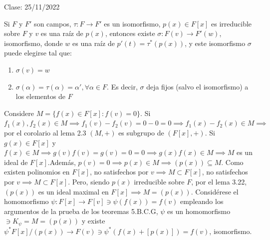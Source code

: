 Clase: 25/11/2022


\begin{teorema}[5I]
    Si $F$ y $F'$ son campos, $\tau:F\to F'$ es un isomorfismo, $p(x)\in F[x]$ es irreducible sobre $F$ y $v$ es una raíz de $p(x)$, entonces existe $\sigma:F(v)\to F'(w)$, isomorfismo, donde $w$ es una raíz de $p'(t)=\tau^*(p(x))$, y este isomorfismo $\sigma$ puede elegirse tal que:
    \begin{enumerate}
        \item $\sigma(v)=w$
        \item $\sigma(\alpha)=\tau(\alpha)=\alpha',\forall \alpha \in F$. Es decir, $\sigma$ deja fijos (salvo el isomorfismo) a los elementos de $F$
    \end{enumerate}
    \begin{dem}
        Considere $M=\{f(x)\in F[x]:f(v)=0\}$. Si $f_1(x),f_2(x)\in M\implies f_1(v)-f_2(v)=0-0=0\implies f_1(x)-f_2(x)\in M\implies$ por el corolario al lema 2.3 $(M,+)$ es subgrupo de $(F[x], +)$. Si $g(x)\in F[x]$ y $f(x)\in M\implies g(v)f(v)=g(v)=0=0\implies g(x)f(x)\in M\implies M$ es un ideal de $F[x]$.Además, $p(v)=0\implies p(x)\in M\implies (p(x))\subseteq M$.
        Como existen polinomios en $F[x]$, no satisfechos por $v\implies M\subset F[x]$, no satisfechos por $v\implies M\subset F[x]$. Pero, siendo $p(x)$ irreducible sobre $F$, por el lema 3.22, $(p(x))$ es un ideal maximal en $F[x]\implies M=(p(x))$. Considérese el homomorfismo $\psi:F[x]\to F[v]\ni \psi(f(x))=f(v)$ empleando los argumentos de la prueba de los teoremas 5.B.C.G, $\psi$ es un homomorfismo $\ni K_\psi =M=(p(x))$ y existe $\psi^* F[x]/(p(x))\to F(v)\ni \psi^*(f(x)+[p(x)])=f(v)$, isomorfismo.
        

\end{dem}
\end{teorema}
